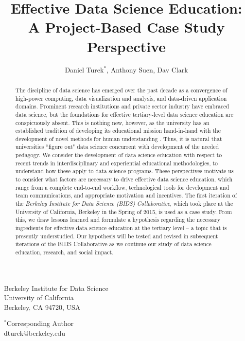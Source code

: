 \documentclass[12pt]{article}
\begin{document}
\title{Effective Data Science Education: \\
\large A Project-Based Case Study Perspective}

\author{Daniel Turek$^{*}$, Anthony Suen, Dav Clark}

\date{}

\maketitle

\vspace{0.4in}
\begin{center}

Berkeley Institute for Data Science \\
University of California \\
Berkeley, CA 94720, USA

\vspace{0.8in}

$^*$Corresponding Author \\
dturek@berkeley.edu
\end{center}

\thispagestyle{empty}
\newpage

\begin{abstract}
The discipline of data science has emerged over the past decade as a convergence of high-power computing, data visualization and analysis, and data-driven application domains.  Prominent research institutions and private sector industry have embraced data science, but the foundations for effective tertiary-level data science education are conspicuously absent. This is nothing new, however, as the university has an established tradition of developing its educational mission hand-in-hand with the development of novel methods for human understanding \citep{feingold_tradition_1991}. Thus, it is natural that universities ``figure out" data science concurrent with development of the needed pedagogy. We consider the development of data science education with respect to recent trends in interdisciplinary and experiential educational methodologies, to understand how these apply to data science programs. These perspectives motivate us to consider what factors are necessary to drive effective data science education, which range from a complete end-to-end workflow, technological tools for development and team communications, and appropriate motivation and incentives. The first iteration of the \emph{Berkeley Institute for Data Science (BIDS) Collaborative}, which took place at the University of California, Berkeley in the Spring of 2015, is used as a case study. From this, we draw lessons learned and formulate a hypothesis regarding the necessary ingredients for effective data science education at the tertiary level -- a topic that is presently understudied.  Our hypothesis will be tested and revised in subsequent iterations of the BIDS Collaborative as we continue our study of data science education, research, and social impact.
\end{abstract}
\end{document}
